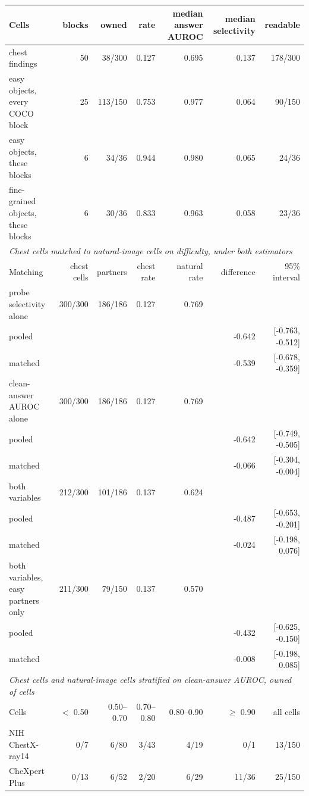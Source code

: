\documentclass{article}
\begin{document}
\begin{table}[htbp]
{\begin{tabular}{lrrrrrr}
Cells & blocks & owned & rate & median answer AUROC & median selectivity & readable \\
\midrule
chest findings & 50 & 38/300 & 0.127 & 0.695 & 0.137 & 178/300 \\
easy objects, every COCO block & 25 & 113/150 & 0.753 & 0.977 & 0.064 & 90/150 \\
easy objects, these blocks & 6 & 34/36 & 0.944 & 0.980 & 0.065 & 24/36 \\
fine-grained objects, these blocks & 6 & 30/36 & 0.833 & 0.963 & 0.058 & 23/36 \\
\midrule
\multicolumn{7}{l}{\textit{Chest cells matched to natural-image cells on difficulty, under both estimators}} \\
Matching & chest cells & partners & chest rate & natural rate & difference & 95\% interval \\
\midrule
probe selectivity alone & 300/300 & 186/186 & 0.127 & 0.769 &  &  \\
\quad pooled &  &  &  &  & -0.642 & [-0.763, -0.512] \\
\quad matched &  &  &  &  & -0.539 & [-0.678, -0.359] \\
clean-answer AUROC alone & 300/300 & 186/186 & 0.127 & 0.769 &  &  \\
\quad pooled &  &  &  &  & -0.642 & [-0.749, -0.505] \\
\quad matched &  &  &  &  & -0.066 & [-0.304, -0.004] \\
both variables & 212/300 & 101/186 & 0.137 & 0.624 &  &  \\
\quad pooled &  &  &  &  & -0.487 & [-0.653, -0.201] \\
\quad matched &  &  &  &  & -0.024 & [-0.198, 0.076] \\
both variables, easy partners only & 211/300 & 79/150 & 0.137 & 0.570 &  &  \\
\quad pooled &  &  &  &  & -0.432 & [-0.625, -0.150] \\
\quad matched &  &  &  &  & -0.008 & [-0.198, 0.085] \\
\midrule
\multicolumn{7}{l}{\textit{Chest cells and natural-image cells stratified on clean-answer AUROC, owned of cells}} \\
Cells & $<$ 0.50 & 0.50--0.70 & 0.70--0.80 & 0.80--0.90 & $\geq$ 0.90 & all cells \\
\midrule
NIH ChestX-ray14 & 0/7 & 6/80 & 3/43 & 4/19 & 0/1 & 13/150 \\
CheXpert Plus & 0/13 & 6/52 & 2/20 & 6/29 & 11/36 & 25/150 \\

\end{tabular}}
\end{table}
\end{document}
